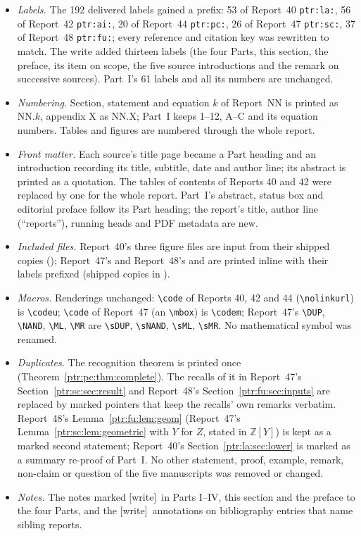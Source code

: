 \documentclass[11pt,letterpaper]{article}
\theoremstyle{definition}\newtheorem{definition}[theorem]{Definition}
\theoremstyle{remark}\newtheorem{remark}[theorem]{Remark}
\newcommand{\Z}{\mathbb Z}\newcommand{\N}{\mathbb N}\newcommand{\Zp}{\mathbb Z_{>0}}
\newcommand{\op}[1]{\mathrm{#1}}
\newcommand{\code}[1]{\texttt{\detokenize{#1}}}
\newcommand{\codeu}[1]{\nolinkurl{#1}}
\newcommand{\codem}[1]{\mbox{\normalfont\ttfamily\detokenize{#1}}}
\newcommand{\DUP}{\operatorname{DUP}}\newcommand{\ML}{\operatorname{MOVE\_LEFT}}
\newcommand{\MR}{\operatorname{MOVE\_RIGHT}}\newcommand{\COPY}{\operatorname{COPY}}
\newcommand{\sDUP}{\op{DUP}}\newcommand{\sNAND}{\op{NAND}}
\newcommand{\sML}{\op{MOVE\_LEFT}}\newcommand{\sMR}{\op{MOVE\_RIGHT}}
\newcommand{\wtag}{\textup{[write]}}
\begin{document}
\begin{itemize}
\item \emph{Labels.} The 192 delivered labels gained a prefix: 53 of
Report~40 \texttt{ptr:la:}, 56 of Report~42 \texttt{ptr:ai:}, 20 of
Report~44 \texttt{ptr:pc:}, 26 of Report~47 \texttt{ptr:sc:}, 37 of
Report~48 \texttt{ptr:fu:}; every reference and citation key was rewritten
to match. The write added thirteen labels (the four Parts, this section, the
preface, its item on scope, the five source introductions and the remark on
successive sources). Part~I's 61 labels and all its numbers are unchanged.
\item \emph{Numbering.} Section, statement and equation $k$ of Report~NN is
printed as NN.$k$, appendix X as NN.X; Part~I keeps 1--12, A--C and its
equation numbers. Tables and figures are numbered through the whole report.
\item \emph{Front matter.} Each source's title page became a Part heading
and an introduction recording its title, subtitle, date and author line;
its abstract is printed as a quotation. The tables of contents of Reports 40
and 42 were replaced by one for the whole report. Part~I's abstract, status
box and editorial preface follow its Part heading; the report's title, author
line (``reports''), running heads and PDF metadata are new.
\item \emph{Included files.} Report~40's three figure files are input from
their shipped copies
(); Report~47's
 and Report~48's  and
 are printed inline with their labels prefixed
(shipped copies in ).
\item \emph{Macros.} Renderings unchanged: \verb|\code| of Reports 40, 42
and 44 (\verb|\nolinkurl|) is \verb|\codeu|; \verb|\code| of Report~47
(an \verb|\mbox|) is \verb|\codem|; Report~47's \verb|\DUP|, \verb|\NAND|,
\verb|\ML|, \verb|\MR| are \verb|\sDUP|, \verb|\sNAND|, \verb|\sML|,
\verb|\sMR|. No mathematical symbol was renamed.
\item \emph{Duplicates.} The recognition theorem is printed once
(Theorem~\ref{ptr:pc:thm:complete}). The recalls of it in Report~47's
Section~\ref{ptr:sc:sec:result} and Report~48's
Section~\ref{ptr:fu:sec:inputs} are replaced by marked pointers that keep the
recalls' own remarks verbatim. Report~48's Lemma~\ref{ptr:fu:lem:geom}
(Report~47's Lemma~\ref{ptr:sc:lem:geometric} with $Y$ for $Z$, stated in
$\Z[Y]$) is kept as a marked second statement; Report~40's
Section~\ref{ptr:la:sec:lower} is marked as a summary re-proof of Part~I. No
other statement, proof, example, remark, non-claim or question of the five
manuscripts was removed or changed.
\item \emph{Notes.} The notes marked \wtag\ in Parts I--IV, this section and
the preface to the four Parts, and the \wtag\ annotations on bibliography
entries that name sibling reports.
\end{itemize}
\end{document}

